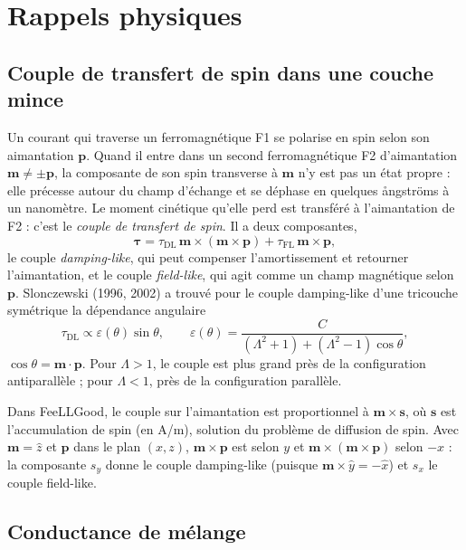 \documentclass[11pt,a4paper]{article}
\newcommand{\vm}{\bm{m}}
\newcommand{\vp}{\bm{p}}
\newcommand{\vs}{\bm{s}}
\begin{document}
\section{Rappels physiques}

\subsection{Couple de transfert de spin dans une couche mince}

Un courant qui traverse un ferromagnétique F1 se polarise en spin selon
son aimantation $\vp$. Quand il entre dans un second ferromagnétique F2
d'aimantation $\vm\neq\pm\vp$, la composante de son spin transverse à $\vm$
n'y est pas un état propre : elle précesse autour du champ d'échange et se
déphase en quelques ångströms à un nanomètre. Le moment cinétique qu'elle
perd est transféré à l'aimantation de F2 : c'est le \emph{couple de
transfert de spin}. Il a deux composantes,
\begin{equation}
  \bm{\tau} = \tau_{\mathrm{DL}}\,\vm\times(\vm\times\vp)
            + \tau_{\mathrm{FL}}\,\vm\times\vp ,
\end{equation}
le couple \emph{damping-like}, qui peut compenser l'amortissement et
retourner l'aimantation, et le couple \emph{field-like}, qui agit comme un
champ magnétique selon $\vp$. Slonczewski (1996, 2002) a trouvé pour le
couple damping-like d'une tricouche symétrique la dépendance angulaire
\begin{equation}
  \tau_{\mathrm{DL}} \propto \varepsilon(\theta)\sin\theta,
  \qquad
  \varepsilon(\theta) = \frac{C}{(\Lambda^2+1)+(\Lambda^2-1)\cos\theta},
  \label{eq:slonczewski}
\end{equation}
$\cos\theta = \vm\cdot\vp$. Pour $\Lambda > 1$, le couple est plus grand
près de la configuration antiparallèle ; pour $\Lambda < 1$, près de la
configuration parallèle.

Dans FeeLLGood, le couple sur l'aimantation est proportionnel à
$\vm\times\vs$, où $\vs$ est l'accumulation de spin (en A/m), solution du
problème de diffusion de spin. Avec $\vm = \hat z$ et $\vp$ dans le plan
$(x,z)$, $\vm\times\vp$ est selon $y$ et $\vm\times(\vm\times\vp)$ selon
$-x$ : la composante $s_y$ donne le couple damping-like (puisque
$\vm\times\hat y = -\hat x$) et $s_x$ le couple field-like.

\subsection{Conductance de mélange}
\end{document}
